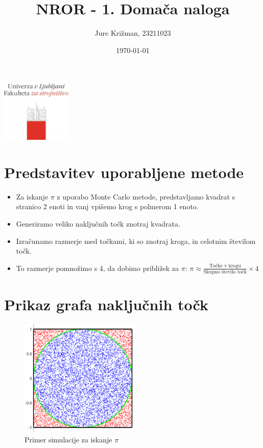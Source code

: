 \documentclass{beamer}
\title{NROR - 1. Domača naloga}
\author{Jure Križman, 23211023}
\date{\today}
\begin{document}
\begin{frame}
\titlepage
\centering
\includegraphics[width=0.25\textwidth]{sliak3.png}
\end{frame}


\section{Predstavitev uporabljene metode}
\begin{frame}
\tableofcontents[currentsection] %
\end{frame}
\begin{frame}
\begin{itemize}
\item Za iskanje $\pi$ z uporabo Monte Carlo metode, predstavljamo kvadrat s stranico 2 enoti in vanj vpišemo krog s polmerom 1 enoto.
\pause
\item Generiramo veliko naključnih točk znotraj kvadrata.
\pause
\item Izračunamo razmerje med točkami, ki so znotraj kroga, in celotnim številom točk.
\item To razmerje pomnožimo s 4, da dobimo približek za $\pi$: $\pi \approx \frac{\text{Točke v krogu}}{\text{Skupno število točk}} \times 4$
\end{itemize}
\end{frame}




\section{Prikaz grafa naključnih točk}
\begin{frame}
\tableofcontents[currentsection] %
\end{frame}
\begin{frame}
\begin{figure}
\includegraphics[width=0.5\textwidth]{slika11.png}
\caption{Primer simulacije za iskanje $\pi$}
\end{figure}
\end{frame}
\end{document}
